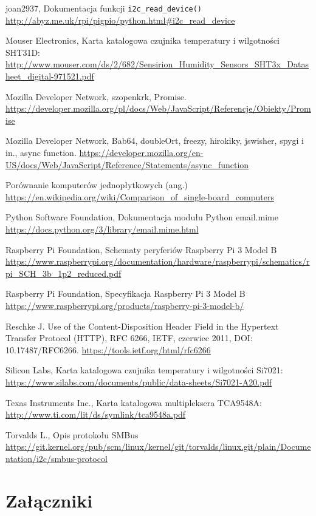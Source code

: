 \documentclass[a4paper,12pt,twoside]{article}
\begin{document}
\begin{thebibliography}{9}
joan2937, Dokumentacja funkcji \texttt{i2c{\_}read{\_}device()}
\url{http://abyz.me.uk/rpi/pigpio/python.html#i2c_read_device}

Mouser Electronics, Karta katalogowa czujnika temperatury i wilgotności SHT31D:
\url{http://www.mouser.com/ds/2/682/Sensirion_Humidity_Sensors_SHT3x_Datasheet_digital-971521.pdf}

Mozilla Developer Network, szopenkrk, Promise.
\url{https://developer.mozilla.org/pl/docs/Web/JavaScript/Referencje/Obiekty/Promise}

Mozilla Developer Network, Bab64, doubleOrt, freezy, hirokiky, jswisher, spygi i in., async function.
\url{https://developer.mozilla.org/en-US/docs/Web/JavaScript/Reference/Statements/async_function}

Porównanie komputerów jednopłytkowych (ang.)
\url{https://en.wikipedia.org/wiki/Comparison_of_single-board_computers}

Python Software Foundation, Dokumentacja modułu Python email.mime
\url{https://docs.python.org/3/library/email.mime.html}

Raspberry Pi Foundation, Schematy peryferiów Raspberry Pi 3 Model B
\url{https://www.raspberrypi.org/documentation/hardware/raspberrypi/schematics/rpi_SCH_3b_1p2_reduced.pdf}

Raspberry Pi Foundation, Specyfikacja Raspberry Pi 3 Model B
\url{https://www.raspberrypi.org/products/raspberry-pi-3-model-b/}

Reschke J. Use of the Content-Disposition Header Field in the Hypertext Transfer Protocol (HTTP), RFC 6266, IETF, czerwiec 2011, DOI: 10.17487/RFC6266.
\url{https://tools.ietf.org/html/rfc6266}

Silicon Labs, Karta katalogowa czujnika temperatury i wilgotności Si7021:
\url{https://www.silabs.com/documents/public/data-sheets/Si7021-A20.pdf}

Texas Instruments Inc., Karta katalogowa multipleksera TCA9548A:
\url{http://www.ti.com/lit/ds/symlink/tca9548a.pdf}

Torvalds L., Opis protokołu SMBus
\url{https://git.kernel.org/pub/scm/linux/kernel/git/torvalds/linux.git/plain/Documentation/i2c/smbus-protocol}

\end{thebibliography}

\newpage
\section{Załączniki}
\end{document}

